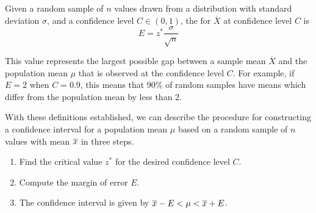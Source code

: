 \begin{definition} Given a random sample of $n$ values drawn from a distribution with standard deviation $\sigma$, and a confidence level $C \in (0,1)$, the  for $\overline{X}$ at confidence level $C$ is 
$$E = z^* \frac{\sigma}{\sqrt{n}}$$
\end{definition}

This value represents the largest possible gap between a sample mean $\overline{X}$ and the population mean $\mu$ that is observed at the confidence level $C$. For example, if $E = 2$ when $C = 0.9$, this means that 90\% of random samples have means which differ from the population mean by less than $2$.

With these definitions established, we can describe the procedure for constructing a confidence interval for a population mean $\mu$ based on a random sample of $n$ values with mean ${\overline{x}}$ in three steps.
\begin{enumerate}[label=\textnormal{\Roman*}.]
\item Find the critical value $z^*$ for the desired confidence level $C$.
\item Compute the margin of error $E$.
\item The confidence interval is given by ${\overline{x}} - E < \mu < {\overline{x}} + E$.
\end{enumerate}

